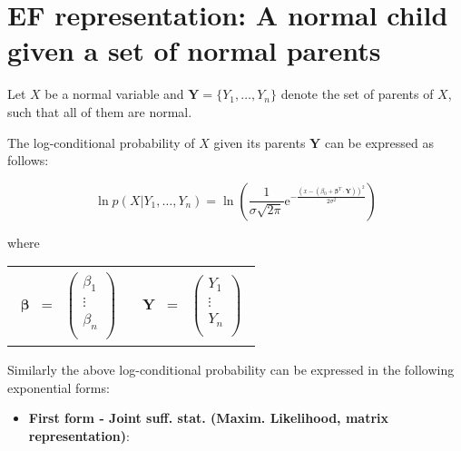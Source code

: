 \documentclass[11pt, oneside]{article}   	%
\newcommand{\bm}{\mathbf}
\newcommand{\bs}{\boldsymbol}
\newcommand{\me}{\mathrm{e}}
\numberwithin{figure}{section}
\numberwithin{equation}{section}
\numberwithin{table}{section}
\theoremstyle{definition}
\begin{document}
\begin{appendices}
\begin{itemize}
\end{itemize}


\newpage
\section{EF representation: A normal child given a set of normal parents}

Let $X$ be a normal variable and $ \mathbf{Y} = \{Y_1,\ldots,Y_n\}$ denote the set of parents of $X$, such that all of them are normal. 

The log-conditional probability of $X$ given its parents $\mathbf{Y}$ can be expressed as follows:

$$ \ln p(X|Y_1,\ldots,Y_n) = \ln \left(\frac{1}{\sigma \sqrt{2\pi}} \me^{-\frac{(x-(\beta_0+ \bs \beta^T \cdot \bm Y))^2}{2\sigma^2}} \right)$$

where

\begin{tabular}{p{4cm}p{4cm}}
\begin{eqnarray*}
\bs \beta &=& 
\begin{pmatrix}
\beta_1\\
\vdots\\
\beta_n\\
\end{pmatrix}
\end{eqnarray*}
&
\begin{eqnarray*}
\bm Y &=& 
\begin{pmatrix}
Y_1\\
\vdots\\
Y_n\\
\end{pmatrix}
\end{eqnarray*}
\\
\end{tabular}

Similarly the above log-conditional probability can be expressed in the following exponential forms:


\newcommand{\Z}{\bm Z}
\newcommand{\Y}{\bm Y}
\newcommand{\thb}{\bs \theta}
\newcommand{\beb}{\bs \beta}

\begin{itemize}
\item \textbf{First form - Joint suff. stat. (Maxim. Likelihood, matrix representation)}:


\end{itemize}
\end{appendices}
\end{document}

